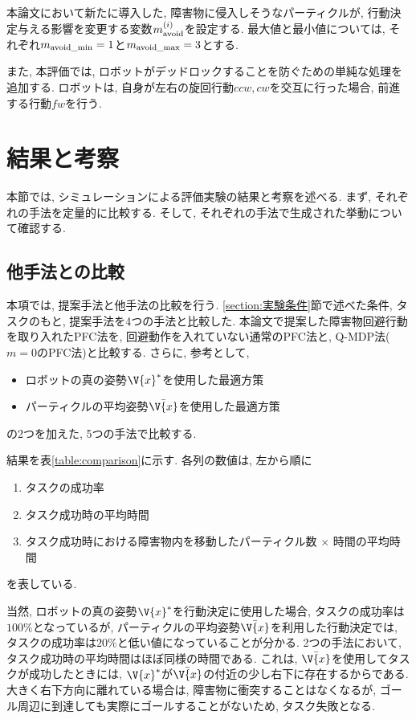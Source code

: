 本論文において新たに導入した, 障害物に侵入しそうなパーティクルが, 行動決定与える影響を変更する変数$m^{(i)}_{\rm avoid}$を設定する. 
最大値と最小値については, それぞれ$m_{\rm avoid\_min} = 1$と$m_{\rm avoid\_max} = 3$とする. 

また, 本評価では, ロボットがデッドロックすることを防ぐための単純な処理を追加する. 
ロボットは, 自身が左右の旋回行動$ccw, cw$を交互に行った場合, 前進する行動$fw$を行う. 


\section{結果と考察} \label{section:結果}
本節では, シミュレーションによる評価実験の結果と考察を述べる. 
まず, それぞれの手法を定量的に比較する. 
そして, それぞれの手法で生成された挙動について確認する. 

\subsection{他手法との比較}
本項では, 提案手法と他手法の比較を行う. 
\ref{section:実験条件}節で述べた条件, タスクのもと, 提案手法を4つの手法と比較した. 
本論文で提案した障害物回避行動を取り入れたPFC法を, 
回避動作を入れていない通常のPFC法と, Q-MDP法($m=0$のPFC法)と比較する. 
さらに, 参考として, 
\begin{itemize}
  \item ロボットの真の姿勢$\V{x}^{*}$を使用した最適方策
  \item パーティクルの平均姿勢$\bar{\V{x}}$を使用した最適方策
\end{itemize}
の2つを加えた, 5つの手法で比較する. 

結果を表\ref{table:comparison}に示す. 
各列の数値は, 左から順に
\begin{enumerate}
  \item タスクの成功率
  \item タスク成功時の平均時間
  \item タスク成功時における障害物内を移動したパーティクル数 $\times$ 時間の平均時間
\end{enumerate}
を表している. 

当然, ロボットの真の姿勢$\V{x}^{*}$を行動決定に使用した場合, タスクの成功率は$100\%$となっているが, 
パーティクルの平均姿勢$\bar{\V{x}}$を利用した行動決定では, タスクの成功率は$20\%$と低い値になっていることが分かる. 
2つの手法において, タスク成功時の平均時間はほぼ同様の時間である. 
これは, $\bar{\V{x}}$を使用してタスクが成功したときには, $\V{x}^{*}$が$\bar{\V{x}}$の付近の少し右下に存在するからである. 
大きく右下方向に離れている場合は, 障害物に衝突することはなくなるが, ゴール周辺に到達しても実際にゴールすることがないため, タスク失敗となる. 


